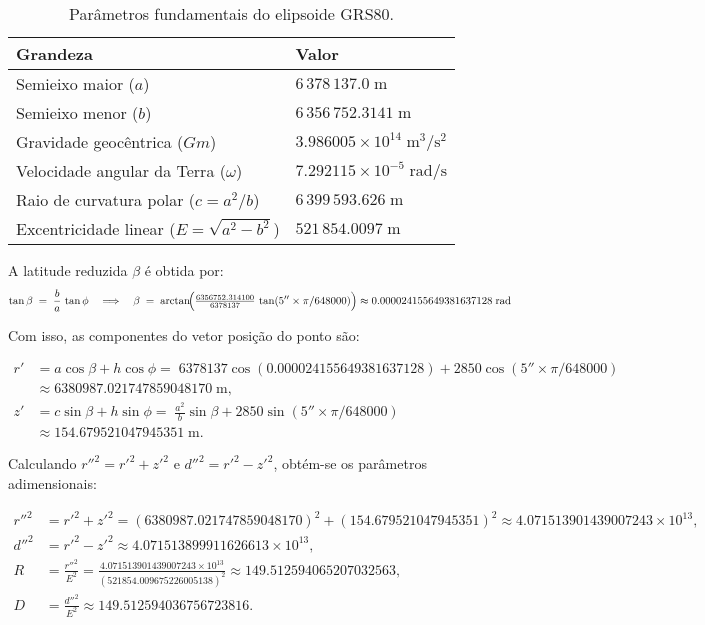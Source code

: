 \begin{table}[h]
\centering
\caption{Parâmetros fundamentais do elipsoide GRS80.}
\label{tab:grs80}
\begin{tabular}{ll}
\toprule
Grandeza & Valor \\
\midrule
Semieixo maior (\(a\)) & \(6\,378\,137.0\;\text{m}\) \\
Semieixo menor (\(b\)) & \(6\,356\,752.3141\;\text{m}\) \\
Gravidade geocêntrica (\(Gm\)) & \(3.986005 \times 10^{14}\;\text{m}^3/\text{s}^2\) \\
Velocidade angular da Terra (\(\omega\)) & \(7.292115 \times 10^{-5}\;\text{rad/s}\) \\
Raio de curvatura polar (\(c = a^2/b\)) & \(6\,399\,593.626\;\text{m}\) \\
Excentricidade linear (\(E = \sqrt{a^2 - b^2}\)) & \(521\,854.0097\;\text{m}\) \\
\bottomrule
\end{tabular}
\end{table}

\noindent
A latitude reduzida \(\beta\) é obtida por:
\[
\tan\beta \;=\;\frac{b}{a}\,\tan\phi
\quad\Longrightarrow\quad
\beta \;=\;\arctan\!\Bigl(\tfrac{6356752.314100}{6378137}\,\tan(5''\times\pi/648000)\Bigr)
\approx 0.000024155649381637128\;\mathrm{rad}
\]

\noindent
Com isso, as componentes do vetor posição do ponto são:

\[
\begin{aligned}
   r' &= a\cos\beta + h\cos\phi
   =\;6378137\cos(0.000024155649381637128)+2850\cos(5''\times\pi/648000)\\
   &\approx 6380987.021747859048170\;\mathrm{m},\\
   z' &= c\sin\beta + h\sin\phi
   =\;\tfrac{a^2}{b}\sin\beta + 2850\sin(5''\times\pi/648000)\\
   &\approx 154.679521047945351\;\mathrm{m}.
\end{aligned}
\]

\noindent
Calculando \(r''^2 = r'^2 + z'^2\) e \(d''^2 = r'^2 - z'^2\), obtém-se os parâmetros adimensionais:

\[
\begin{aligned}
   r''^2 &= r'^2 + z'^2 
   = (6380987.021747859048170)^2 + (154.679521047945351)^2 
   \approx 4.071513901439007243\times10^{13},\\
   d''^2 &= r'^2 - z'^2 
   \approx 4.071513899911626613\times10^{13},\\
   R &= \frac{r''^2}{E^2}
   = \frac{4.071513901439007243\times10^{13}}{(521854.009675226005138)^2}
   \approx 149.512594065207032563,\\
   D &= \frac{d''^2}{E^2}
   \approx 149.512594036756723816.
\end{aligned}
\]

